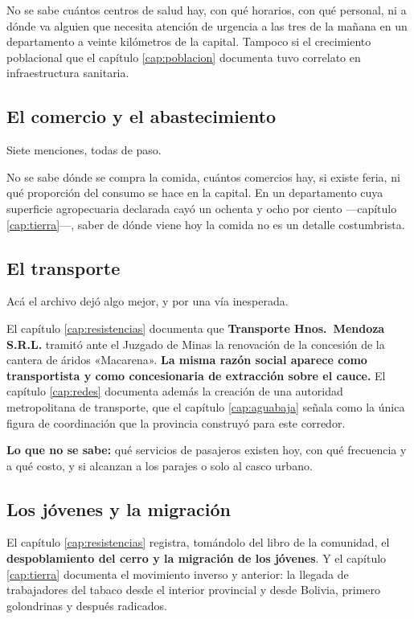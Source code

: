 No se sabe cuántos centros de salud hay, con qué horarios, con qué personal, ni a dónde va
alguien que necesita atención de urgencia a las tres de la mañana en un departamento a veinte
kilómetros de la capital. Tampoco si el crecimiento poblacional que el capítulo
\ref{cap:poblacion} documenta tuvo correlato en infraestructura sanitaria.

\subsection*{El comercio y el abastecimiento}

Siete menciones, todas de paso.

No se sabe dónde se compra la comida, cuántos comercios hay, si existe feria, ni qué proporción
del consumo se hace en la capital. En un departamento cuya superficie agropecuaria declarada cayó un ochenta y ocho por ciento ---capítulo \ref{cap:tierra}---, saber de dónde viene hoy la comida
no es un detalle costumbrista.

\subsection*{El transporte}

Acá el archivo dejó algo mejor, y por una vía inesperada.

El capítulo \ref{cap:resistencias} documenta que \textbf{Transporte Hnos.\ Mendoza S.R.L.}
tramitó ante el Juzgado de Minas la renovación de la concesión de la cantera de áridos
«Macarena». \textbf{La misma razón social aparece como transportista y como concesionaria de
extracción sobre el cauce.} El capítulo \ref{cap:redes} documenta además la creación de una
autoridad metropolitana de transporte, que el capítulo \ref{cap:aguabaja} señala como la única
figura de coordinación que la provincia construyó para este corredor.

\textbf{Lo que no se sabe:} qué servicios de pasajeros existen hoy, con qué frecuencia y a qué
costo, y si alcanzan a los parajes o solo al casco urbano.

\subsection*{Los jóvenes y la migración}

El capítulo \ref{cap:resistencias} registra, tomándolo del libro de la
comunidad, el \textbf{despoblamiento del cerro y la migración de los jóvenes}. Y el capítulo
\ref{cap:tierra} documenta el movimiento inverso y anterior: la llegada de trabajadores del
tabaco desde el interior provincial y desde Bolivia, primero golondrinas y después radicados.

